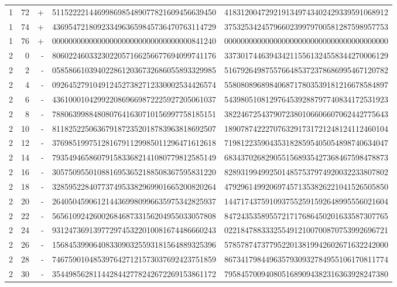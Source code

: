 \begin{longtable}{rrrll}
1 & 72 & + & 5115222214469986985489077821609456639450 & 4183120047292191349743402429339591068912 \\
1 & 74 & + & 4369547218092334963659845736470763114729 & 3753253424579660239979700581287598957753 \\
1 & 76 & + & 0000000000000000000000000000000000841240 & 0000000000000000000000000000000000000000 \\
2 & 0 & - & 8060224603323022057166256677694099741176 & 3373017446394342115561324558344270006129 \\
2 & 2 & - & 0585866103940228612036732686055893329985 & 5167926498755766485372378686995467120782 \\
2 & 4 & - & 0926452791049124527382712330002534426574 & 5580808968984068717803539181216678584897 \\
2 & 6 & - & 4361000104299220869669872225927205061037 & 5439805108129764539288797740834172531923 \\
2 & 8 & - & 7880639988480807641630710156997758185151 & 3822467254379072380106606607062442775643 \\
2 & 10 & - & 8118252250636791872352018783963818692507 & 1890787422270763291731721248124112460104 \\
2 & 12 & - & 3769851997512816791129985011296471612618 & 7198122359043531828595405054898740634047 \\
2 & 14 & - & 7935494658607915833682141080779812585149 & 6834370268290551568935427368467598478873 \\
2 & 16 & - & 3057509550108816953652188508367595831220 & 8289319949925014857537974920032233807802 \\
2 & 18 & - & 3285952284077374953382969901665200820264 & 4792961499206974571353826221041526505850 \\
2 & 20 & - & 2640504590612144369980996635975342825937 & 1447174375910937552591592648995556021604 \\
2 & 22 & - & 5656109242600268468733156204955033057808 & 8472435358955721717686450201633587307765 \\
2 & 24 & - & 9312473691397729745322010081674486660243 & 0221847883332554912100700870753992696721 \\
2 & 26 & - & 1568453990640833090325593181564889325396 & 5785787473779522013819942602671632242000 \\
2 & 28 & - & 7467590104853976427121573037692423751859 & 8673417984496357930932784955106170811774 \\
2 & 30 & - & 3544985628114428442778242672269153861172 & 7958457009408051689094382316363928247380 \\

\end{longtable}
